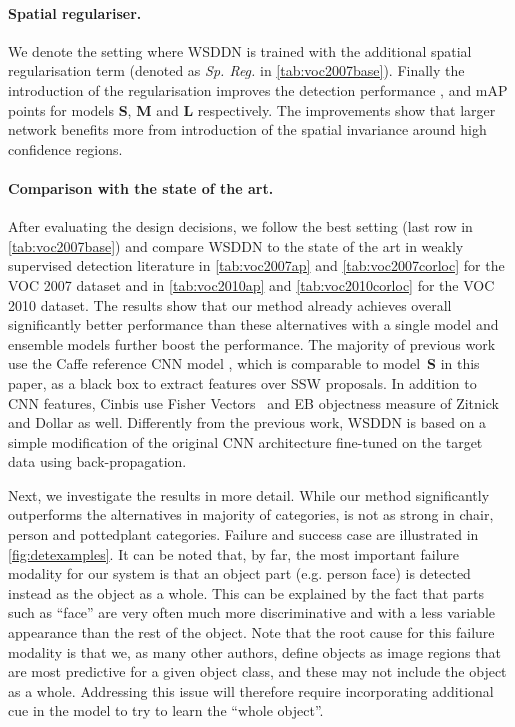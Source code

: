 \documentclass[10pt,twocolumn,letterpaper]{article}
\begin{document}
\paragraph{Spatial regulariser.} We denote the setting where WSDDN is trained with the additional spatial regularisation term (denoted as \emph{Sp. Reg.} in \cref{tab:voc2007base}). Finally the introduction of the regularisation improves the detection performance ,  and  mAP points for models \textbf{S}, \textbf{M} and \textbf{L} respectively. The improvements show that larger network benefits more from introduction of the spatial invariance around high confidence regions.


\paragraph{Comparison with the state of the art.}
After evaluating the design decisions, we follow the best setting (last row in \cref{tab:voc2007base}) and compare WSDDN to the state of the art in weakly supervised detection literature in \cref{tab:voc2007ap} and \cref{tab:voc2007corloc} for the VOC 2007 dataset and in \cref{tab:voc2010ap} and \cref{tab:voc2010corloc} for the VOC 2010 dataset. The results show that our method already achieves overall significantly better performance than these alternatives with a single model and ensemble models further boost the performance. The majority of previous work \cite{Song14,Song14a,Bilen14,Wang14,Bilen15} use the Caffe reference CNN model \cite{Jia13}, which is comparable to model~\textbf{S} in this paper, as a black box to extract features over SSW proposals. In addition to CNN features, Cinbis \etal \cite{Cinbis15} use Fisher Vectors~\cite{Perronnin10a} and EB objectness measure of Zitnick and Dollar \cite{Zitnick14} as well. Differently from the previous work, WSDDN is based on a simple modification of the original CNN architecture fine-tuned on the target data using back-propagation.

Next, we investigate the results in more detail. While our method significantly outperforms the alternatives in majority of categories, is not as strong in chair, person and pottedplant categories. Failure and success case are illustrated in \cref{fig:detexamples}. It can be noted that, by far, the most important failure modality for our system is that an object part (e.g. person face) is detected instead as the object as a whole. This can be explained by the fact that parts such as ``face'' are very often much more discriminative and with a less variable appearance than the rest of the object. Note that the root cause for this failure modality is that we, as many other authors, define objects as image regions that are most predictive for a given object class, and these may not include the object as a whole. Addressing this issue will therefore require incorporating additional cue in the model to try to learn the ``whole object''.
\end{document}
